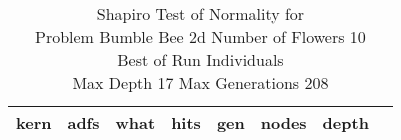 \begin{table}[H]
\caption{Shapiro Test of Normality for \\ Problem  Bumble Bee 2d  Number of Flowers 10\\Best of Run Individuals \\ Max Depth 17 Max Generations 208\\}
\begin{center}
\scalebox{0.8} %
{
\begin{tabular}{lrrrrrrr}
\hline
kern & adfs & what & hits & gen & nodes & depth \\
\hline


\end{tabular}
}
\end{center}
\end{table}

